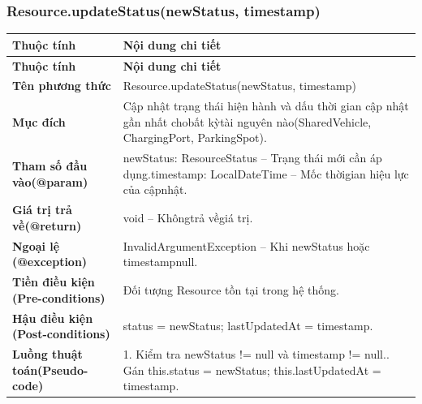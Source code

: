 \subsubsection{Resource.updateStatus(newStatus, timestamp)}
\begin{longtable}{|L{0.24\textwidth}|L{0.70\textwidth}|}
\hline
\textbf{Thuộc tính} & \textbf{Nội dung chi tiết} \\
\hline
\endfirsthead
\hline
\textbf{Thuộc tính} & \textbf{Nội dung chi tiết} \\
\hline
\endhead
\textbf{Tên phương thức} & Resource.updateStatus(newStatus, timestamp) \\
\hline
\textbf{Mục đích} & Cập nhật trạng thái hiện hành và dấu thời gian cập nhật gần nhất cho\newline bất kỳtài nguyên nào(SharedVehicle, ChargingPort, ParkingSpot). \\
\hline
\textbf{Tham số đầu vào}\newline \textbf{(@param)} & newStatus: ResourceStatus – Trạng thái mới cần áp dụng.\newline timestamp: LocalDateTime – Mốc thờigian hiệu lực của cậpnhật. \\
\hline
\textbf{Giá trị trả về(@return)} & void – Khôngtrả vềgiá trị. \\
\hline
\textbf{Ngoại lệ (@exception)} & InvalidArgumentException – Khi newStatus hoặc timestampnull. \\
\hline
\textbf{Tiền điều kiện (Pre-}\newline \textbf{conditions)} & Đối tượng Resource tồn tại trong hệ thống. \\
\hline
\textbf{Hậu điều kiện (Post-}\newline \textbf{conditions)} & status = newStatus; lastUpdatedAt = timestamp. \\
\hline
\textbf{Luồng thuật toán}\newline \textbf{(Pseudo-code)} & 1. Kiểm tra newStatus != null và timestamp != null.. Gán this.status = newStatus; this.lastUpdatedAt = timestamp. \\
\hline
\end{longtable}
\vspace{-0.5\baselineskip}
